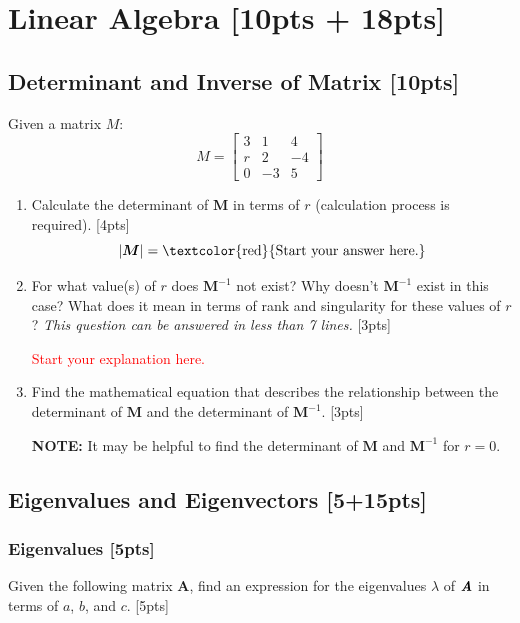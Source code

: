 \documentclass{article}
\begin{document}
\newpage

\section{Linear Algebra [10pts + 18pts]}
\subsection{Determinant and Inverse of Matrix [10pts]}
Given a matrix $M$:
$$M = \begin{bmatrix} 
    3 & 1 & 4 \\ 
    r & 2 & -4 \\
    0 & -3 & 5
\end{bmatrix}$$
\begin{enumerate}[label=(\alph*)]
    \item Calculate the determinant of $\boldsymbol{M}$ in terms of $r$ (calculation process is required). [4pts]
    $$|\boldsymbol{M}| = \text{\textcolor{red}{Start your answer here.}} $$

    \item For what value(s) of $r$ does $\boldsymbol{M}^{-1}$ not exist? Why doesn't $\boldsymbol{M}^{-1}$ exist in this case? What does it mean in terms of rank and singularity for these values of $r$? \textit{This question can be answered in less than 7 lines. } [3pts]
    
    \textcolor{red}{Start your explanation here.} %
    
    
    \item Find the mathematical equation that describes the relationship between the determinant of $\boldsymbol{M}$ and the determinant of $\boldsymbol{M}^{-1}$. [3pts]
    \par\textbf{NOTE:} It may be helpful to find the determinant of $\boldsymbol{M}$ and $\boldsymbol{M}^{-1}$ for $r = 0$.
    
\end{enumerate}
\newpage



\subsection{Eigenvalues and Eigenvectors [5+15pts]}
\subsubsection{Eigenvalues [5pts]}
Given the following matrix $\boldsymbol{A}$, find an expression for the eigenvalues $\lambda$ of $\textbf{\textit{A}}$ in terms of $a$, $b$, and $c$. [5pts] 
\end{document}
